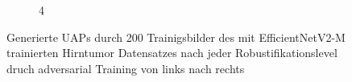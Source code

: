 \begin{figure}[ht!]
\begin{subfigure}{0.095\linewidth}
        \caption{4}
    \end{subfigure}
    \caption{Generierte UAPs durch 200 Trainigsbilder des mit EfficientNetV2-M trainierten Hirntumor Datensatzes nach jeder Robustifikationslevel druch adversarial Training von links nach rechts}
    \label{fig:uap-resnet18-covidx-rob0}
\end{figure}



